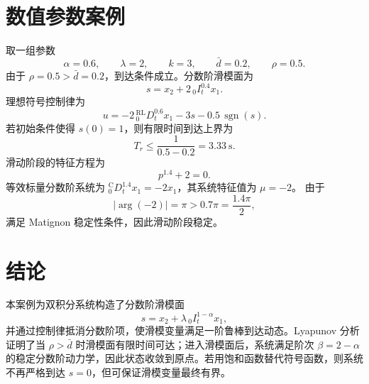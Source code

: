 \documentclass[UTF8,a4paper,11pt]{ctexart}
\newcommand{\sgn}{\operatorname{sgn}}
\begin{document}
\section{数值参数案例}

取一组参数
\begin{equation}
  \alpha=0.6,\qquad
  \lambda=2,\qquad
  k=3,\qquad
  \bar d=0.2,\qquad
  \rho=0.5.
\end{equation}
由于 $\rho=0.5>\bar d=0.2$，到达条件成立。分数阶滑模面为
\begin{equation}
  s=x_2+2\,{}_0 I_t^{0.4}x_1.
\end{equation}
理想符号控制律为
\begin{equation}
  u
  =
  -2\,{}_0^{\mathrm{RL}}D_t^{0.6}x_1
  -3s
  -0.5\,\sgn(s).
\end{equation}
若初始条件使得 $s(0)=1$，则有限时间到达上界为
\begin{equation}
  T_r
  \le
  \frac{1}{0.5-0.2}
  =
  3.33\ \mathrm{s}.
\end{equation}
滑动阶段的特征方程为
\begin{equation}
  p^{1.4}+2=0.
\end{equation}
等效标量分数阶系统为 ${}_0^{\mathrm{C}}D_t^{1.4}x_1=-2x_1$，其系统特征值为 $\mu=-2$。
由于
\begin{equation}
  |\arg(-2)|=\pi>0.7\pi=\frac{1.4\pi}{2},
\end{equation}
满足 Matignon 稳定性条件，因此滑动阶段稳定。

\section{结论}

本案例为双积分系统构造了分数阶滑模面
\[
  s=x_2+\lambda\,{}_0 I_t^{1-\alpha}x_1,
\]
并通过控制律抵消分数阶项，使滑模变量满足一阶鲁棒到达动态。Lyapunov 分析证明了当 $\rho>\bar d$ 时滑模面有限时间可达；进入滑模面后，系统满足阶次 $\beta=2-\alpha$ 的稳定分数阶动力学，因此状态收敛到原点。若用饱和函数替代符号函数，则系统不再严格到达 $s=0$，但可保证滑模变量最终有界。
\end{document}

